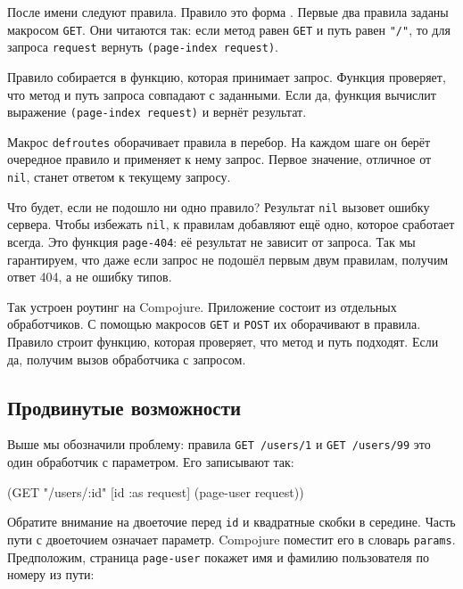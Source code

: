 После имени следуют правила. Правило это форма .
Первые два правила заданы макросом \verb|GET|. Они читаются так:
если метод равен \verb|GET| и путь равен \verb|"/"|, то для запроса
\verb|request| вернуть \verb|(page-index request)|.

Правило собирается в функцию, которая принимает запрос. Функция проверяет, что
метод и путь запроса совпадают с заданными. Если да, функция вычислит выражение
\verb|(page-index request)| и вернёт результат.


Макрос \verb|defroutes| оборачивает правила в перебор. На каждом шаге он берёт
очередное правило и применяет к нему запрос. Первое значение, отличное от
\verb|nil|, станет ответом к текущему запросу.

Что будет, если не подошло ни одно правило? Результат \verb|nil| вызовет
ошибку сервера. Чтобы избежать \verb|nil|, к правилам добавляют ещё одно,
которое сработает всегда. Это функция \verb|page-404|: её результат не
зависит от запроса. Так мы гарантируем, что даже если запрос не подошёл первым
двум правилам, получим ответ 404, а не ошибку типов.

Так устроен роутинг на Compojure. Приложение состоит из отдельных
обработчиков. С помощью макросов \verb|GET| и \verb|POST| их оборачивают в
правила. Правило строит функцию, которая проверяет, что метод и путь
подходят. Если да, получим вызов обработчика с запросом.

\subsection{Продвинутые возможности}

Выше мы обозначили проблему: правила \verb|GET /users/1|
и \verb|GET /users/99| это один обработчик с параметром. Его записывают так:


\begin{english}
  \begin{clojure}
(GET "/users/:id" [id :as request] (page-user request))
  \end{clojure}
\end{english}

Обратите внимание на двоеточие перед \verb|id| и квадратные скобки в середине.
Часть пути с двоеточием означает параметр. Compojure поместит его в словарь
\verb|params|. Предположим, страница \verb|page-user| покажет имя и фамилию
пользователя по номеру из пути:

